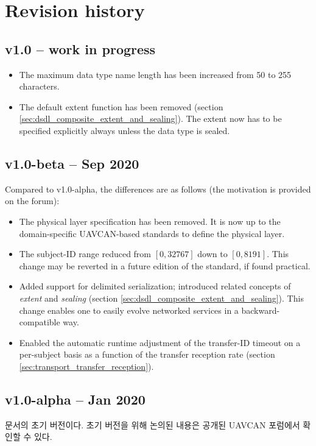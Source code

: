 \section{Revision history}

\subsection{v1.0 -- work in progress}

\begin{itemize}
    \item The maximum data type name length has been increased from 50 to 255 characters.

    \item The default extent function has been removed (section \ref{sec:dsdl_composite_extent_and_sealing}).
    The extent now has to be specified explicitly always unless the data type is sealed.
\end{itemize}

\subsection{v1.0-beta -- Sep 2020}

Compared to v1.0-alpha, the differences are as follows (the motivation is provided on the forum):

\begin{itemize}
    \item The physical layer specification has been removed.
    It is now up to the domain-specific UAVCAN-based standards to define the physical layer.

    \item The subject-ID range reduced from $[0, 32767]$ down to $[0, 8191]$.
    This change may be reverted in a future edition of the standard, if found practical.

    \item Added support for delimited serialization; introduced related concepts of \emph{extent} and \emph{sealing}
    (section \ref{sec:dsdl_composite_extent_and_sealing}).
    This change enables one to easily evolve networked services in a backward-compatible way.

    \item Enabled the automatic runtime adjustment of the transfer-ID timeout on a per-subject basis
    as a function of the transfer reception rate (section \ref{sec:transport_transfer_reception}).
\end{itemize}

\subsection{v1.0-alpha -- Jan 2020}

문서의 초기 버전이다.
초기 버전을 위해 논의된 내용은 공개된 UAVCAN 포럼에서 확인할 수 있다.
